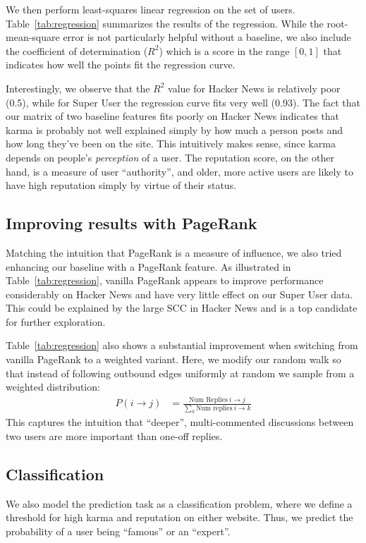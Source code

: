 \documentclass[10pt]{article}
\begin{document}
We then perform least-squares linear regression on the set of users.
Table~\ref{tab:regression} summarizes the results of the regression. While the
root-mean-square error is not particularly helpful without a baseline, we also
include the coefficient of determination ($R^2$) which is a score in the range
$[0, 1]$ that indicates how well the points fit the regression curve.

Interestingly, we observe that the $R^2$ value for Hacker News is relatively
poor (0.5), while for Super User the regression curve fits very well (0.93). The
fact that our matrix of two baseline features fits poorly on Hacker News
indicates that karma is probably not well explained simply by how much a person
posts and how long they've been on the site. This intuitively makes sense, since
karma depends on people's \emph{perception} of a user. The reputation score, on
the other hand, is a measure of user ``authority'', and older, more active users
are likely to have high reputation simply by virtue of their status.

\subsection{Improving results with PageRank}
\label{sec:baseline-and-pagerank}
Matching the intuition that PageRank is a measure of influence, we also tried
enhancing our baseline with a PageRank feature. As illustrated in Table~\ref{tab:regression},
vanilla PageRank appears to improve performance considerably on Hacker News and have
very little effect on our Super User data. This could be explained by the large SCC
in Hacker News and is a top candidate for further exploration.

Table~\ref{tab:regression} also shows a substantial improvement
when switching from vanilla PageRank to a weighted variant. Here, we modify
our random walk so that instead of following outbound edges uniformly at random
we sample from a weighted distribution:
\begin{align}
P(i\rightarrow j)  &= \frac{\text{Num Replies}\ i \rightarrow j}{\sum_k \text{Num
replies}\ i \rightarrow k}
\end{align}
This captures the intuition that ``deeper'', multi-commented discussions
between two users are more important than one-off replies.


\subsection{Classification}
We also model the prediction task as a classification problem, where we define a
threshold for high karma and reputation on either website. Thus, we predict the
probability of a user being ``famous'' or an ``expert''.
\end{document}
